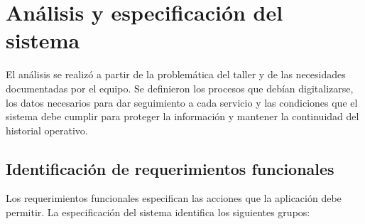 \section{Análisis y especificación del sistema}

El análisis se realizó a partir de la problemática del taller y de las necesidades documentadas por el equipo. Se definieron los procesos que debían digitalizarse, los datos necesarios para dar seguimiento a cada servicio y las condiciones que el sistema debe cumplir para proteger la información y mantener la continuidad del historial operativo.

\subsection{Identificación de requerimientos funcionales}

Los requerimientos funcionales especifican las acciones que la aplicación debe permitir. La especificación del sistema identifica los siguientes grupos:

